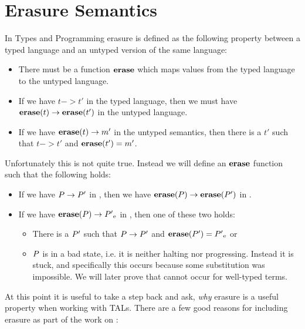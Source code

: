 \chapter{Erasure Semantics}
\label{chap:erasure}

In Types and Programming\cite{typesandprog} erasure is defined as the following
property between a typed language and an untyped version of the same language:

\begin{itemize}
\item There must be a function ${\mathbf{erase}}$ which maps values from the typed language
  to the untyped language.
\item If we have $t -> t'$ in the typed language, then we must have
  ${\mathbf{erase}}(t) -> {\mathbf{erase}}(t')$ in the untyped language.
\item If we have ${\mathbf{erase}}(t) -> m'$ in the untyped semantics, then there is a $t'$
  such that $t -> t'$ and ${\mathbf{erase}}(t') = m'$.
\end{itemize}

Unfortunately this is not quite true. Instead we will define an ${\mathbf{erase}}$ function
such that the following holds:

\begin{itemize}
\item If we have ${P} -> {P'}$ in \ATAL, then we have
  ${{\mathbf{erase}}(P)} -> {{\mathbf{erase}}(P')}$ in \ATALe.
\item If we have ${{\mathbf{erase}}(P)} -> {{{P'}_{\mathrm{e}}}}$ in \ATALe, then one of
  these two holds:
  \begin{itemize}
  \item There is a $P'$ such that ${P} -> {P'}$ and
    ${\mathbf{erase}}(P') = {{P'}_{\mathrm{e}}}$ or
  \item $P$ is in a bad state, i.e. it is neither halting nor
    progressing. Instead it is stuck, and specifically this occurs because some
    substitution was impossible. We will later prove that cannot occur for
    well-typed terms.
  \end{itemize}
\end{itemize}

At this point it is useful to take a step back and ask, \emph{why} erasure is a
useful property when working with TALs. There are a few good reasons for
including erasure as part of the work on \ATAL:

